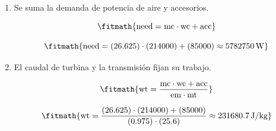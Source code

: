 \begin{enumerate}

\item Se suma la demanda de potencia de aire y accesorios.

\[\fitmath{\mathrm{need}=\mathrm{mc}\cdot \mathrm{wc}+\mathrm{acc}}\]

\[\fitmath{\mathrm{need}=(26.625)\cdot (214000)+(85000)\approx 5782750\,\mathrm{W}}\]

\item El caudal de turbina y la transmisión fijan su trabajo.

\[\fitmath{\mathrm{wt}=\frac{\mathrm{mc}\cdot \mathrm{wc}+\mathrm{acc}}{\mathrm{em}\cdot \mathrm{mt}}}\]

\[\fitmath{\mathrm{wt}=\frac{(26.625)\cdot (214000)+(85000)}{(0.975)\cdot (25.6)}\approx 231680.7\,\mathrm{J/kg}}\]

\end{enumerate}
